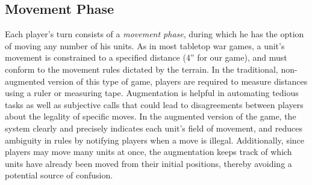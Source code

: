 \documentclass[review]{vgtc}                 %
\begin{document}
\subsection{Movement Phase}

Each player's turn consists of a \emph{movement phase}, during which
he has the option of moving any number of his units.  As in most
tabletop war games, a unit's movement is constrained to a specified
distance (4'' for our game), and must conform to the movement rules
dictated by the terrain.
%
In the traditional, non-augmented version of this type of  game,
players are required to measure distances using a ruler or measuring
tape.
%
Augmentation is helpful
in automating tedious tasks
as well as subjective calls that could lead to disagreements between
players about the legality of specific moves.  In the augmented
version of the game,
the system 
clearly and precisely indicates each unit's field of movement, and
reduces ambiguity in rules by notifying players when a move is
illegal.  Additionally, since players may move many units at once, the
augmentation keeps track of which units have already been moved from
their initial positions, thereby avoiding a potential source of
confusion.
\end{document}
